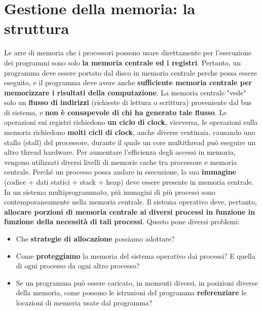 \documentclass[12pt]{article}
\begin{document}
\section{Gestione della memoria: la struttura}
Le arre di memoria che i processori possono usare direttamente per l'esecuzione dei programmi sono solo \textbf{la memoria centrale ed i registri}.
Pertanto, un programma deve essere portato dal disco in memoria centrale perche possa essere eseguito, e il programma deve avere anche \textbf{sufficiente memoria centrale per memorizzare i risultati della computazione}.
La memoria centrale "vede" solo un \textbf{flusso di indirizzi} (richieste di lettura o scrittura) proveniente dal bus di sistema, e \textbf{non è consapevole di chi ha generato tale flusso}.
Le operazioni sui registri richiedono \textbf{un ciclo di clock}, viceversa, le operazioni sulla memoria richiedono \textbf{molti cicli di clock}, anche diverse centinaia, causando uno stallo (stall) del processore, durante il quale
un core multithread può eseguire un altro thread hardware.
Per aumentare l'efficienza degli accessi in memoria, vengono utilizzati diversi livelli di memorie cache tra processore e memoria centrale.
Perché un processo possa andare in esecuzione, la sua \textbf{immagine} (codice + dati statici + stack + heap) deve essere presente in memoria centrale.
In un sistema multiprogrammato, più immagini di più processi sono contemporaneamente nella memoria centrale.
Il sistema operativo deve, pertanto, \textbf{allocare porzioni di memoria centrale ai diversi processi in funzione in funzione della necessità di tali processi}.
Questo pone diversi problemi:
\begin{itemize}
    \item Che \textbf{strategie di allocazione} possiamo adottare?
    \item Come \textbf{proteggiamo} la memoria del sistema operativo dai processi? E quella di ogni processo da ogni altro processo?
    \item Se un programma può essere caricato, in momenti diversi, in posizioni diverse della memoria, come possono le istruzioni del programma \textbf{referenziare} le locazioni di memoria usate dal programma?
\end{itemize}
\end{document}
